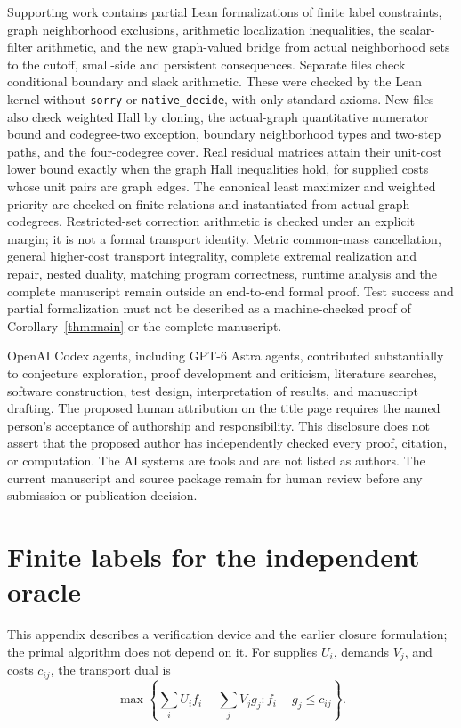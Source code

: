 \documentclass[11pt]{article}
\theoremstyle{remark}
\begin{document}
Supporting work contains partial Lean formalizations of finite label constraints, graph neighborhood exclusions, arithmetic localization inequalities, the scalar-filter arithmetic, and the new graph-valued bridge from actual neighborhood sets to the cutoff, small-side and persistent consequences. Separate files check conditional boundary and slack arithmetic. These were checked by the Lean kernel without \texttt{sorry} or \texttt{native\_decide}, with only standard axioms. New files also check weighted Hall by cloning, the actual-graph quantitative numerator bound and codegree-two exception, boundary neighborhood types and two-step paths, and the four-codegree cover. Real residual matrices attain their unit-cost lower bound exactly when the graph Hall inequalities hold, for supplied costs whose unit pairs are graph edges. The canonical least maximizer and weighted priority are checked on finite relations and instantiated from actual graph codegrees. Restricted-set correction arithmetic is checked under an explicit margin; it is not a formal transport identity. Metric common-mass cancellation, general higher-cost transport integrality, complete extremal realization and repair, nested duality, matching program correctness, runtime analysis and the complete manuscript remain outside an end-to-end formal proof. Test success and partial formalization must not be described as a machine-checked proof of Corollary~\ref{thm:main} or the complete manuscript.

OpenAI Codex agents, including GPT-6 Astra agents, contributed substantially to conjecture exploration, proof development and criticism, literature searches, software construction, test design, interpretation of results, and manuscript drafting. The proposed human attribution on the title page requires the named person's acceptance of authorship and responsibility. This disclosure does not assert that the proposed author has independently checked every proof, citation, or computation. The AI systems are tools and are not listed as authors. The current manuscript and source package remain for human review before any submission or publication decision.

\appendix
\section{Finite labels for the independent oracle}\label{sec:oraclelabels}

This appendix describes a verification device and the earlier closure formulation; the primal algorithm does not depend on it. For supplies $U_i$, demands $V_j$, and costs $c_{ij}$, the transport dual is
\begin{equation}\label{eq:dual}
 \max\left\{\sum_iU_if_i-\sum_jV_jg_j:f_i-g_j\le c_{ij}\right\}.
\end{equation}
\end{document}
